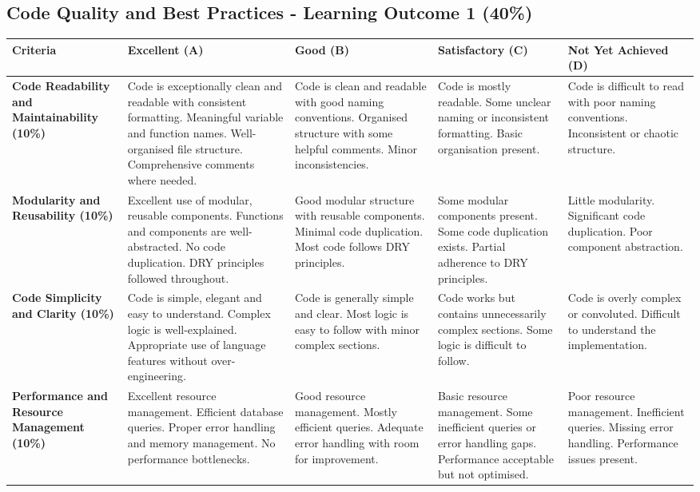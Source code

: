 \documentclass{article}
\begin{document}
\begin{landscape}
\subsection*{Code Quality and Best Practices - Learning Outcome 1 (40\%)}

\begin{tabular}{|p{5cm}|p{4cm}|p{4cm}|p{4cm}|p{4cm}|}
\hline
\textbf{Criteria} & \textbf{Excellent (A)} & \textbf{Good (B)} & \textbf{Satisfactory (C)} & \textbf{Not Yet Achieved (D)} \\ \hline

\textbf{Code Readability and Maintainability (10\%)} & 
Code is exceptionally clean and readable with consistent formatting. Meaningful variable and function names. Well-organised file structure. Comprehensive comments where needed. & 
Code is clean and readable with good naming conventions. Organised structure with some helpful comments. Minor inconsistencies. & 
Code is mostly readable. Some unclear naming or inconsistent formatting. Basic organisation present. & 
Code is difficult to read with poor naming conventions. Inconsistent or chaotic structure. \\ \hline

\textbf{Modularity and Reusability (10\%)} & 
Excellent use of modular, reusable components. Functions and components are well-abstracted. No code duplication. DRY principles followed throughout. & 
Good modular structure with reusable components. Minimal code duplication. Most code follows DRY principles. & 
Some modular components present. Some code duplication exists. Partial adherence to DRY principles. & 
Little modularity. Significant code duplication. Poor component abstraction. \\ \hline

\textbf{Code Simplicity and Clarity (10\%)} & 
Code is simple, elegant and easy to understand. Complex logic is well-explained. Appropriate use of language features without over-engineering. & 
Code is generally simple and clear. Most logic is easy to follow with minor complex sections. & 
Code works but contains unnecessarily complex sections. Some logic is difficult to follow. & 
Code is overly complex or convoluted. Difficult to understand the implementation. \\ \hline

\textbf{Performance and Resource Management (10\%)} & 
Excellent resource management. Efficient database queries. Proper error handling and memory management. No performance bottlenecks. & 
Good resource management. Mostly efficient queries. Adequate error handling with room for improvement. & 
Basic resource management. Some inefficient queries or error handling gaps. Performance acceptable but not optimised. & 
Poor resource management. Inefficient queries. Missing error handling. Performance issues present. \\ \hline


\end{tabular}
\end{landscape}
\end{document}
